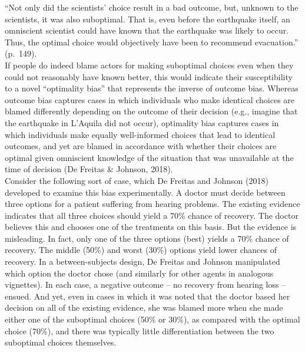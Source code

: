 \documentclass[
  man,floatsintext]{apa6}
\begin{document}
``Not only did the scientists' choice result in a bad outcome, but, unknown to the scientists, it was also suboptimal. That is, even before the earthquake itself, an omniscient scientist could have known that the earthquake was likely to occur. Thus, the optimal choice would objectively have been to recommend evacuation.'' (p.~149).\\
If people do indeed blame actors for making suboptimal choices even when they could not reasonably have known better, this would indicate their susceptibility to a novel ``optimality bias'' that represents the inverse of outcome bias. Whereas outcome bias captures cases in which individuals who make identical choices are blamed differently depending on the outcome of their decision (e.g., imagine that the earthquake in L'Aquila did not occur), optimality bias captures cases in which individuals make equally well-informed choices that lead to identical outcomes, and yet are blamed in accordance with whether their choices are optimal given omniscient knowledge of the situation that was unavailable at the time of decision (De Freitas \& Johnson, 2018).\\
Consider the following sort of case, which De Freitas and Johnson (2018) developed to examine this bias experimentally. A doctor must decide between three options for a patient suffering from hearing problems. The existing evidence indicates that all three choices should yield a 70\% chance of recovery. The doctor believes this and chooses one of the treatments on this basis. But the evidence is misleading. In fact, only one of the three options (best) yields a 70\% chance of recovery. The middle (50\%) and worst (30\%) options yield lower chances of recovery. In a between-subjects design, De Freitas and Johnson manipulated which option the doctor chose (and similarly for other agents in analogous vignettes). In each case, a negative outcome -- no recovery from hearing loss -- ensued. And yet, even in cases in which it was noted that the doctor based her decision on all of the existing evidence, she was blamed more when she made either one of the suboptimal choices (50\% or 30\%), as compared with the optimal choice (70\%), and there was typically little differentiation between the two suboptimal choices themselves.\\
\end{document}
